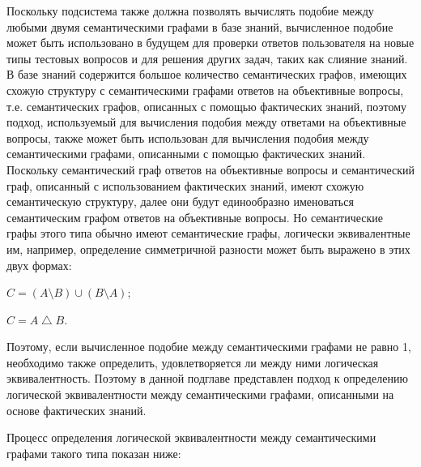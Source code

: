 Поскольку подсистема также должна позволять вычислять подобие между любыми двумя семантическими графами в базе знаний, вычисленное подобие может быть использовано в будущем для проверки ответов пользователя на новые типы тестовых вопросов и для решения других задач, таких как слияние знаний. В базе знаний содержится большое количество семантических графов, имеющих схожую структуру с семантическими графами ответов на объективные вопросы, т.е. семантических графов, описанных с помощью фактических знаний, поэтому подход, используемый для вычисления подобия между ответами на объективные вопросы, также может быть использован для вычисления подобия между семантическими графами, описанными с помощью фактических знаний. Поскольку семантический граф ответов на объективные вопросы и семантический граф, описанный с использованием фактических знаний, имеют схожую семантическую структуру, далее они будут единообразно именоваться семантическим графом ответов на объективные вопросы. Но семантические графы этого типа обычно имеют семантические графы, логически эквивалентные им, например, определение симметричной разности может быть выражено в этих двух формах:

\begin{textitemize}
	\item $C= \left ( A\setminus B \right ) \cup \left ( B \setminus A \right )$;
	\item $C= A\bigtriangleup B$.
\end{textitemize}

Поэтому, если вычисленное подобие между семантическими графами не равно 1, необходимо также определить, удовлетворяется ли между ними логическая эквивалентность. Поэтому в данной подглаве представлен подход к определению логической эквивалентности между семантическими графами, описанными на основе фактических знаний.

Процесс определения логической эквивалентности между семантическими графами такого типа показан ниже:

